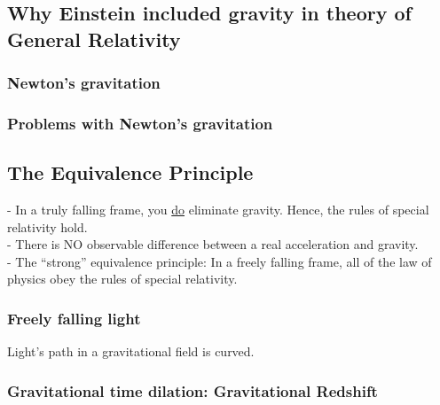 \documentclass[a4paper,11pt]{article}
\numberwithin{equation}{section}
\begin{document}
 \subsection{Why Einstein included gravity in theory of General Relativity}
 \subsubsection{Newton's gravitation}
 \subsubsection{Problems with Newton's gravitation}
 
 \subsection{The Equivalence Principle}
 - In a truly falling frame, you \underline{do} eliminate gravity. Hence, the rules of special relativity hold.\\ 
 - There is NO observable difference between a real acceleration and gravity.\\ 
 - The ``strong'' equivalence principle:
 In a freely falling frame, all of the law  of physics obey the rules of special relativity. 
 \subsubsection{Freely falling light}
 Light's path in a gravitational field is curved.
 \subsubsection{Gravitational time dilation: Gravitational Redshift}
 
 
\end{document}
